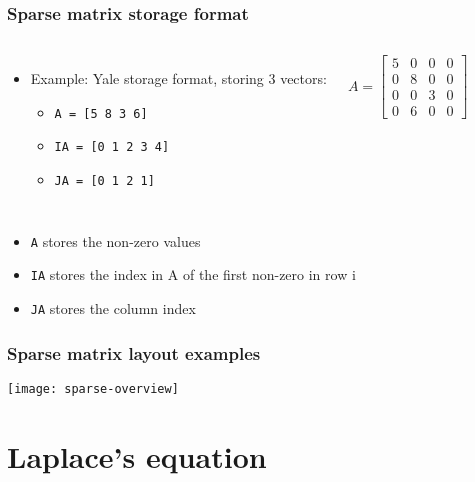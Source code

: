 \begin{frame}[fragile]
  \frametitle{Sparse matrix storage format}
  \begin{columns}
  \begin{itemize}
    \item Example: Yale storage format, storing 3 vectors:
    \begin{itemize}
      \item \lstinline$A = [5 8 3 6]$
      \item \lstinline$IA = [0 1 2 3 4]$
      \item \lstinline$JA = [0 1 2 1]$
    \end{itemize}
  \end{itemize}
  \[
   A = 
   \begin{bmatrix}
    5 & 0 & 0 & 0\\
    0 & 8 & 0 & 0\\
    0 & 0 & 3 & 0\\
    0 & 6 & 0 & 0
    \end{bmatrix}
  \]
  \end{columns}
  \begin{itemize}
    \item \lstinline$A$ stores the non-zero values
    \item \lstinline$IA$ stores the index in A of the first non-zero in row i
    \item \lstinline$JA$ stores the column index
\end{itemize}
\end{frame}

\begin{frame}[fragile]
  \frametitle{Sparse matrix layout examples}
  \begin{center}
   \texttt{[image: sparse-overview]}
  \end{center}
\end{frame}

\section{Laplace's equation}
